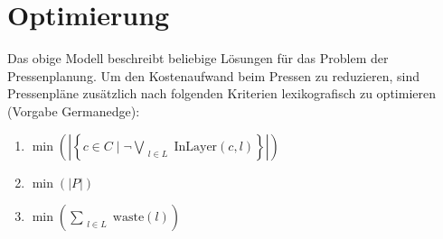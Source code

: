 \section{Optimierung}
\label{sec:optimierung}
Das obige Modell beschreibt beliebige Lösungen für das Problem der Pressenplanung.
Um den Kostenaufwand beim Pressen zu reduzieren, sind Pressenpläne zusätzlich nach folgenden Kriterien lexikografisch zu optimieren (Vorgabe Germanedge):
\begin{enumerate}
    \item $ \min \left( \left\lvert \left\{ c \in C \mid \neg\bigvee\limits_{\substack{l \in L}} \text{InLayer}(c,l) \right\} \right\rvert \right) $
    \item $ \min (\lvert P \rvert) $
    \item $ \min \left(\sum\limits_{\substack{l \in L}} \text{waste}(l) \right) $
\end{enumerate}
